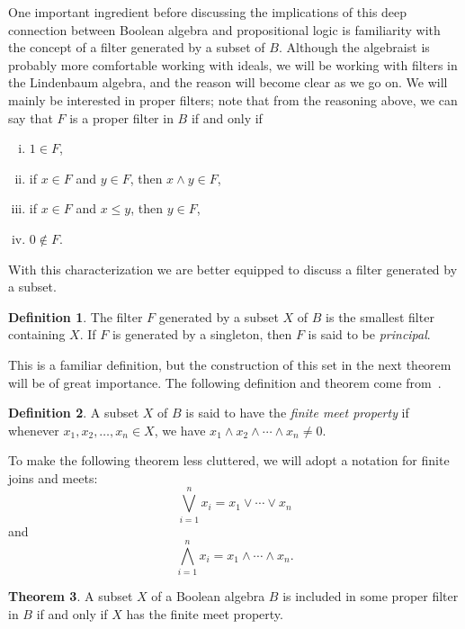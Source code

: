 \documentclass[11pt,titlepage]{article}
\theoremstyle{definition}
\newtheorem{definition}{Definition}[subsection]
\newtheorem{theorem}[definition]{Theorem}
\begin{document}
One important ingredient before discussing the implications of this deep connection between Boolean algebra and propositional logic is familiarity with the concept of a filter generated by a subset of $B$. Although the algebraist is probably more comfortable working with ideals, we will be working with filters in the Lindenbaum algebra, and the reason will become clear as we go on. We will mainly be interested in proper filters; note that from the reasoning above, we can say that $F$ is a proper filter in $B$ if and only if 
\begin{enumerate}[(i)]
\item{$1\in F$,}
\item{if $x\in F$ and $y\in F$, then $x\land y\in F$,}
\item{if $x\in F$ and $x\leq y$, then $y\in F$,}
\item{$0\notin F$.}
\end{enumerate}

With this characterization we are better equipped to discuss a filter generated by a subset.

\begin{definition} The filter $F$ generated by a subset $X$ of $B$ is the smallest filter containing $X$. If $F$ is generated by a singleton, then $F$ is said to be {\em principal}.\end{definition}

This is a familiar definition, but the construction of this set in the next theorem will be of great importance. The following definition and theorem come from~\cite{Bell}.

\begin{definition} A subset $X$ of $B$ is said to have the {\em finite meet property} if whenever $x_1,x_2,\ldots,x_n \in X$, we have $x_1\land x_2 \land \cdots \land x_n \ne 0$.\end{definition}

To make the following theorem less cluttered, we will adopt a notation for finite joins and meets: $$ \bigvee_{i=1}^n x_i = x_1\lor \cdots\lor x_n$$ and $$ \bigwedge_{i=1}^n x_i = x_1\land \cdots\land x_n.$$

\begin{theorem}\label{fmp} A subset $X$ of a Boolean algebra $B$ is included in some proper filter in $B$ if and only if $X$ has the finite meet property. \end{theorem}
\end{document}
